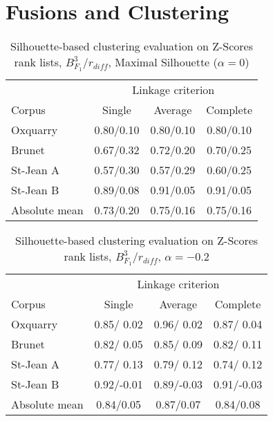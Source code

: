 \section*{Fusions and Clustering}

\begin{table}[H]
  \centering
  \caption{Silhouette-based clustering evaluation on Z-Scores rank lists, $B^3_{F_1}$/$r_{diff}$, Maximal Silhouette ($\alpha = 0$)}
  \label{tab:silhouette-based_clustering_zscore}

  \begin{tabular}{l c c c}
    \toprule
           & \multicolumn{3}{c}{Linkage criterion} \\
    Corpus    & Single     & Average   & Complete \\
    \midrule
    Oxquarry  & 0.80/0.10 & 0.80/0.10 & 0.80/0.10 \\
    Brunet    & 0.67/0.32 & 0.72/0.20 & 0.70/0.25 \\
    St-Jean A & 0.57/0.30 & 0.57/0.29 & 0.60/0.25 \\
    St-Jean B & 0.89/0.08 & 0.91/0.05 & 0.91/0.05 \\
    \midrule
    Absolute mean & 0.73/0.20 & 0.75/0.16 & 0.75/0.16 \\
    \bottomrule
  \end{tabular}
\end{table}

\begin{table}[H]
  \centering
  \caption{Silhouette-based clustering evaluation on Z-Scores rank lists, $B^3_{F_1}$/$r_{diff}$, $\alpha = -0.2$}
  \label{tab:silhouette-based_clustering_zscore_alpha}

  \begin{tabular}{l c c c}
    \toprule
           & \multicolumn{3}{c}{Linkage criterion} \\
    Corpus    & Single     & Average   & Complete \\
    \midrule
    Oxquarry  & 0.85/ 0.02 & 0.96/ 0.02 & 0.87/ 0.04 \\
    Brunet    & 0.82/ 0.05 & 0.85/ 0.09 & 0.82/ 0.11 \\
    St-Jean A & 0.77/ 0.13 & 0.79/ 0.12 & 0.74/ 0.12 \\
    St-Jean B & 0.92/-0.01 & 0.89/-0.03 & 0.91/-0.03 \\
    \midrule
    Absolute mean & 0.84/0.05 & 0.87/0.07 & 0.84/0.08 \\
    \bottomrule
  \end{tabular}
\end{table}


